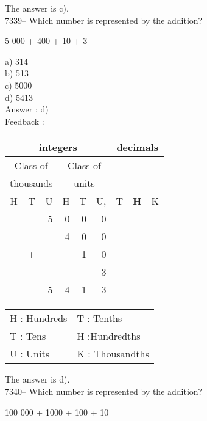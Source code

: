 \documentclass[letterpaper, 12pt]{article}
\begin{document}
The answer is c).\\


7339-- Which number is represented by the addition?\\
\begin{center}
5 000 + 400 + 10 + 3
\end{center}

a) 314\\
b) 513\\
c) 5000\\
d) 5413\\

Answer : d)\\

Feedback :\\
\begin{center}
\begin{tabular}{|rrr|rrr|rrr|}
\hline
\multicolumn{6}{|c|}{integers} &\multicolumn{3}{|c|}{decimals} \\
\hline
\multicolumn{3}{|c|}{Class of} &\multicolumn{3}{|c|}{Class of} &  \multicolumn{3}{c|}{} \\
\multicolumn{3}{|c|}{thousands} &\multicolumn{3}{|c|}{units} &  \multicolumn{3}{c|}{} \\
\hline
H & T & U &H & T & U, & T\up{th} & \textbf{H\up{th}} & K\up{th} \\
\hline
\hline
 &   & 5 & 0 & 0 & 0 & & &\\
 &   &   & 4 & 0 & 0 & & &\\
 & + &   &   & 1 & 0 & & &\\
 &   &   &   &   & 3 & & &\\
\hline
\hline
 &   & 5 & 4 & 1 & 3 & & &\\
\hline
\end{tabular}
\end{center}

\scriptsize
\begin{center}
\begin{tabular}{ll}
H : Hundreds & T\up{th} : Tenths\\
T : Tens & H\up{th} :Hundredths\\
U : Units & K\up{e} : Thousandths\\
\end{tabular}
\end{center}

\normalsize
The answer is d).\\

7340-- Which number is represented by the addition?\\
\begin{center}
100 000 + 1000 + 100 + 10
\end{center}
\end{document}
